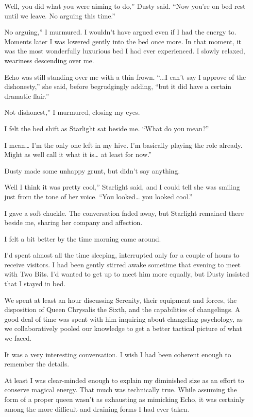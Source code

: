 \leavevmode{}Well, you did what you were aiming to do,” Dusty said. “Now you’re on bed rest until we leave. No arguing this time.”

\leavevmode{}No arguing,” I murmured. I wouldn’t have argued even if I had the energy to. Moments later I was lowered gently into the bed once more. In that moment, it was the most wonderfully luxurious bed I had ever experienced. I slowly relaxed, weariness descending over me.

Echo was still standing over me with a thin frown. “...I can’t say I approve of the dishonesty,” she said, before begrudgingly adding, “but it did have a certain dramatic flair.”

\leavevmode{}Not dishonest,” I murmured, closing my eyes.

I felt the bed shift as Starlight sat beside me. “What do you mean?”

\leavevmode{}I mean… I’m the only one left in my hive. I’m basically playing the role already. Might as well call it what it is… at least for now.”

Dusty made some unhappy grunt, but didn’t say anything.

\leavevmode{}Well I think it was pretty cool,” Starlight said, and I could tell she was smiling just from the tone of her voice. “You looked… you looked cool.”

I gave a soft chuckle. The conversation faded away, but Starlight remained there beside me, sharing her company and affection.

{\br}%
I felt a bit better by the time morning came around.

I’d spent almost all the time sleeping, interrupted only for a couple of hours to receive visitors. I had been gently stirred awake sometime that evening to meet with Two Bits. I’d wanted to get up to meet him more equally, but Dusty insisted that I stayed in bed.

We spent at least an hour discussing Serenity, their equipment and forces, the disposition of Queen Chrysalis the Sixth, and the capabilities of changelings. A good deal of time was spent with him inquiring about changeling psychology, as we collaboratively pooled our knowledge to get a better tactical picture of what we faced.

It was a very interesting conversation. I wish I had been coherent enough to remember the details.

At least I was clear-minded enough to explain my diminished size as an effort to conserve magical energy. That much was technically true. While assuming the form of a proper queen wasn’t as exhausting as mimicking Echo, it was certainly among the more difficult and draining forms I had ever taken.

